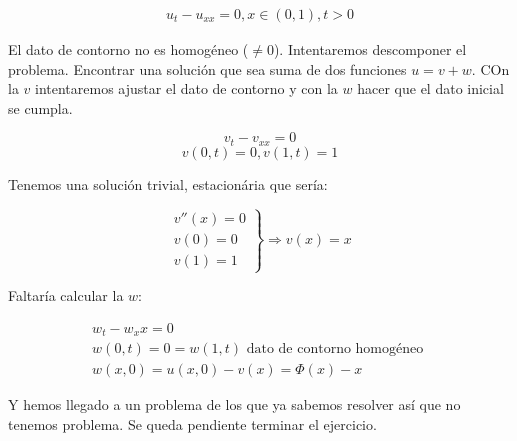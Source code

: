 \begin{problem}[9]

	\[
	\begin{array}{l}
		u_t - u_{xx} = 0, x \in (0,1), t>0
	\end{array}
	\]

	\solution

	El dato de contorno no es homogéneo ($\neq 0$). Intentaremos descomponer el problema. Encontrar una solución que sea suma de dos funciones $u=v+w$. COn la $v$ intentaremos ajustar el dato de contorno y con la $w$ hacer que el dato inicial se cumpla.

	\[ v_t - v_{xx} = 0 \]
	\[ v(0,t) = 0, v(1,t) = 1 \]

	Tenemos una solución trivial, estacionária que sería:

	\[ \left.\begin{array}{l}
		v''(x) = 0 \\
		v(0) = 0 \\
		v(1) = 1
	\end{array}\right\} \Rightarrow v(x) = x  \]

	Faltaría calcular la $w$:

	\[ \begin{array}{l}
		w_t - w_xx = 0 \\
		w(0,t) = 0 = w(1,t) \text{ dato de contorno homogéneo } \\
		w(x,0) = u(x,0) -v(x) = \Phi(x) - x
		\end{array}
	\]

	Y hemos llegado a un problema de los que ya sabemos resolver así que no tenemos problema. Se queda pendiente terminar el ejercicio.

\end{problem}

